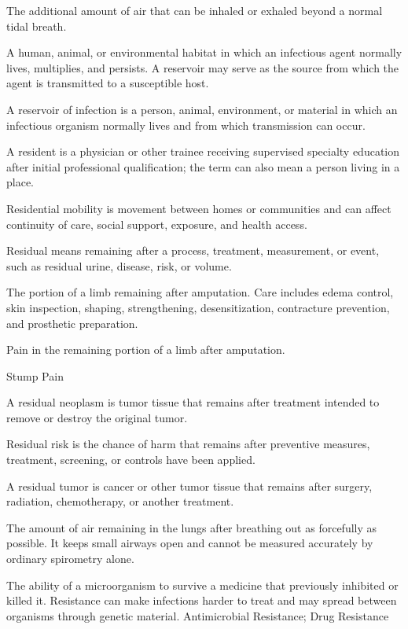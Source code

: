  The additional amount of air that can be inhaled or exhaled beyond a normal tidal breath.

 A human, animal, or environmental habitat in which an infectious agent normally lives,
multiplies, and persists. A reservoir may serve as the source from which the agent is
transmitted to a susceptible host.

 A reservoir of infection is a person, animal, environment, or material in which an infectious organism normally lives and from which transmission can occur.

 A resident is a physician or other trainee receiving supervised specialty education after initial professional qualification; the term can also mean a person living in a place.

 Residential mobility is movement between homes or communities and can affect continuity of care, social support, exposure, and health access.

 Residual means remaining after a process, treatment, measurement, or event, such as residual urine, disease, risk, or volume.

 The portion of a limb remaining after amputation. Care includes edema control, skin
inspection, shaping, strengthening, desensitization, contracture prevention, and
prosthetic preparation.

 Pain in the remaining portion of a limb after amputation.

\synonyms
Stump Pain

 A residual neoplasm is tumor tissue that remains after treatment intended to remove or destroy the original tumor.

 Residual risk is the chance of harm that remains after preventive measures, treatment, screening, or controls have been applied.

 A residual tumor is cancer or other tumor tissue that remains after surgery, radiation, chemotherapy, or another treatment.

 The amount of air remaining in the lungs after breathing out as forcefully as possible. It keeps small airways open and cannot be measured accurately by ordinary spirometry alone.

 The ability of a microorganism to survive a medicine that previously inhibited or killed it. Resistance can make infections harder to treat and may spread between organisms through genetic material.
\synonyms
Antimicrobial Resistance; Drug Resistance

